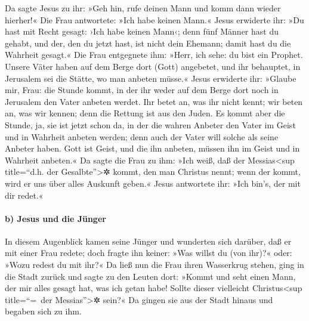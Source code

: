  Da sagte Jesus zu ihr: »Geh hin, rufe deinen Mann und
komm dann wieder hierher!«  Die Frau antwortete: »Ich
habe keinen Mann.« Jesus erwiderte ihr: »Du hast mit Recht gesagt: ›Ich
habe keinen Mann‹;  denn fünf Männer hast du gehabt, und
der, den du jetzt hast, ist nicht dein Ehemann; damit hast du die
Wahrheit gesagt.«  Die Frau entgegnete ihm: »Herr, ich
sehe: du bist ein Prophet.  Unsere Väter haben auf dem
Berge dort (Gott) angebetet, und ihr behauptet, in Jerusalem sei die
Stätte, wo man anbeten müsse.«  Jesus erwiderte ihr:
»Glaube mir, Frau: die Stunde kommt, in der ihr weder auf dem Berge dort
noch in Jerusalem den Vater anbeten werdet.  Ihr betet
an, was ihr nicht kennt; wir beten an, was wir kennen; denn die Rettung
ist aus den Juden.  Es kommt aber die Stunde, ja, sie ist
jetzt schon da, in der die wahren Anbeter den Vater im Geist und in
Wahrheit anbeten werden; denn auch der Vater will solche als seine
Anbeter haben.  Gott ist Geist, und die ihn anbeten,
müssen ihn im Geist und in Wahrheit anbeten.«  Da sagte
die Frau zu ihm: »Ich weiß, daß der Messias\textless sup title=``d.h.
der Gesalbte''\textgreater✲ kommt, den man Christus nennt; wenn der
kommt, wird er uns über alles Auskunft geben.«  Jesus
antwortete ihr: »Ich bin's, der mit dir redet.«

\hypertarget{b-jesus-und-die-juxfcnger}{%
\paragraph{b) Jesus und die Jünger}\label{b-jesus-und-die-juxfcnger}}

 In diesem Augenblick kamen seine Jünger und wunderten
sich darüber, daß er mit einer Frau redete; doch fragte ihn keiner: »Was
willst du (von ihr)?« oder: »Wozu redest du mit ihr?«  Da
ließ nun die Frau ihren Wasserkrug stehen, ging in die Stadt zurück und
sagte zu den Leuten dort:  »Kommt und seht einen Mann,
der mir alles gesagt hat, was ich getan habe! Sollte dieser vielleicht
Christus\textless sup title=``=~der Messias''\textgreater✲ sein?«
 Da gingen sie aus der Stadt hinaus und begaben sich zu
ihm.


